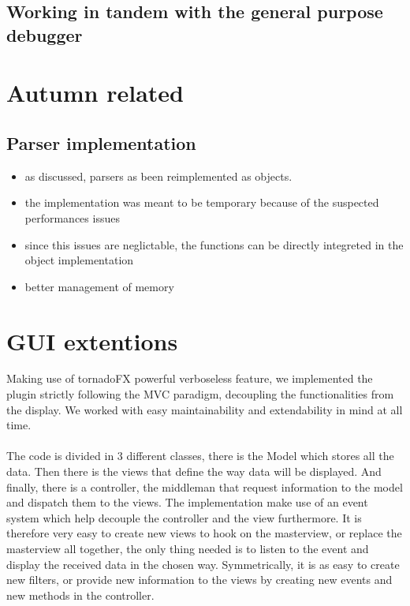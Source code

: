 	\subsection{Working in tandem with the general purpose debugger}

	\section{Autumn related}
		\subsection{Parser implementation}
		\begin{itemize}
			\item as discussed, parsers as been reimplemented as objects.
			\item the implementation was meant to be temporary because of the suspected performances issues
			\item since this issues are neglictable, the functions can be directly integreted in the object implementation
			\item better management of memory
		\end{itemize}

	
	\section{GUI extentions}
	Making use of tornadoFX powerful verboseless feature, we implemented the plugin strictly following the MVC paradigm, decoupling the functionalities from the display. We worked with easy maintainability and extendability in mind at all time. 

	\paragraph{}

	The code is divided in 3 different classes, there is the Model which stores all the data. Then there is the views that define the way data will be displayed. And finally, there is a controller, the middleman that request information to the model and dispatch them to the views. The implementation make use of an event system which help decouple the controller and the view furthermore. It is therefore very easy to create new views to hook on the masterview, or replace the masterview all together, the only thing needed is to listen to the event and display the received data in the chosen way. Symmetrically, it is as easy to create new filters, or provide new information to the views by creating new events and new methods in the controller.

